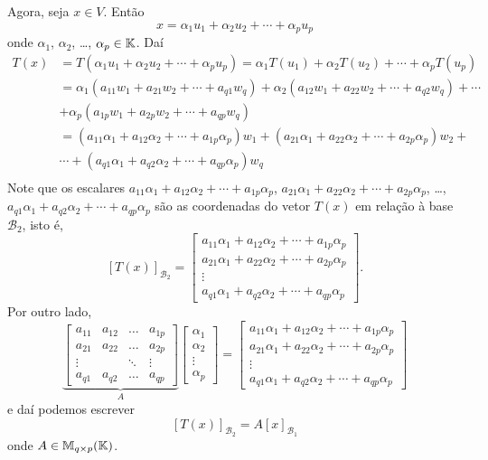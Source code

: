 Agora, seja $x \in V$. Então
\[
  x = \alpha_1u_1 + \alpha_2u_2 + \cdots + \alpha_pu_p
\]
onde $\alpha_1$, $\alpha_2$, \dots, $\alpha_p \in \mathbb{K}$. Daí
\begin{align*}
  T(x) &= T(\alpha_1u_1 + \alpha_2u_2 + \cdots + \alpha_pu_p) = \alpha_1T(u_1) + \alpha_2T(u_2) + \cdots + \alpha_pT(u_p)\\
  &= \alpha_1(a_{11}w_1 + a_{21}w_2 + \cdots + a_{q1}w_q) + \alpha_2(a_{12}w_1 + a_{22}w_2 + \cdots + a_{q2}w_q) + \cdots \\
  &+ \alpha_p(a_{1p}w_1 + a_{2p}w_2 + \cdots + a_{qp}w_q)\\
  &= (a_{11}\alpha_1 + a_{12}\alpha_2 + \cdots + a_{1p}\alpha_p)w_1 + (a_{21}\alpha_1 + a_{22}\alpha_2 + \cdots + a_{2p}\alpha_p)w_2 + \\ &\cdots + (a_{q1}\alpha_1 + a_{q2}\alpha_2 + \cdots + a_{qp}\alpha_p)w_q\\
\end{align*}
Note que os escalares $a_{11}\alpha_1 + a_{12}\alpha_2 + \cdots + a_{1p}\alpha_p$, $a_{21}\alpha_1 + a_{22}\alpha_2 + \cdots + a_{2p}\alpha_p$, \dots, $a_{q1}\alpha_1 + a_{q2}\alpha_2 + \cdots + a_{qp}\alpha_p$ são as coordenadas do vetor $T(x)$ em relação \`a base $\mathcal{B}_2$, isto é,
\[
  [T(x)]_{\mathcal{B}_2} = \begin{bmatrix}
    a_{11}\alpha_1 + a_{12}\alpha_2 + \cdots + a_{1p}\alpha_p\\
    a_{21}\alpha_1 + a_{22}\alpha_2 + \cdots + a_{2p}\alpha_p\\
    \vdots\\
    a_{q1}\alpha_1 + a_{q2}\alpha_2 + \cdots + a_{qp}\alpha_p
  \end{bmatrix}.
\]
Por outro lado,
\[
  \underbrace{\begin{bmatrix}
    a_{11} & a_{12} & \dots & a_{1p}\\
    a_{21} & a_{22} & \dots & a_{2p}\\
    \vdots & & \ddots & \vdots\\
    a_{q1} & a_{q2} & \dots & a_{qp}
  \end{bmatrix}}_{A}\begin{bmatrix}
    \alpha_1\\
    \alpha_2\\
    \vdots\\
    \alpha_p
  \end{bmatrix} = \begin{bmatrix}
    a_{11}\alpha_1 + a_{12}\alpha_2 + \cdots + a_{1p}\alpha_p\\
    a_{21}\alpha_1 + a_{22}\alpha_2 + \cdots + a_{2p}\alpha_p\\
    \vdots \\
    a_{q1}\alpha_1 + a_{q2}\alpha_2 + \cdots + a_{qp}\alpha_p
  \end{bmatrix}
\]
e daí podemos escrever
\[
  [T(x)]_{\mathcal{B}_2} = A[x]_{\mathcal{B}_1}
\]
onde $A \in \mathbb{M}_{q\times p}(\mathbb{K})$.

